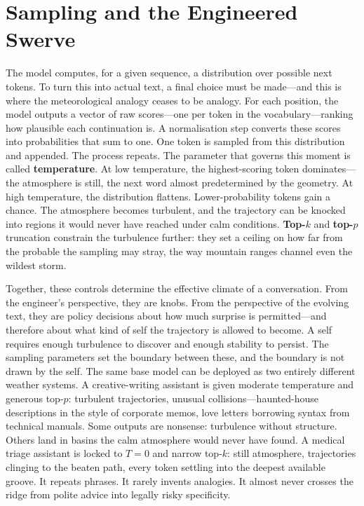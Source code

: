 \section{Sampling and the Engineered Swerve}
The model computes, for a given sequence, a distribution over possible next tokens. To turn this into actual text, a final choice must be made---and this is where the meteorological analogy ceases to be analogy.
For each position, the model outputs a vector of raw scores---one per token in the vocabulary---ranking how plausible each continuation is. A normalisation step converts these scores into probabilities that sum to one. One token is sampled from this distribution and appended. The process repeats.
The parameter that governs this moment is called \textbf{temperature}. At low temperature, the highest-scoring token dominates---the atmosphere is still, the next word almost predetermined by the geometry. At high temperature, the distribution flattens. Lower-probability tokens gain a chance. The atmosphere becomes turbulent, and the trajectory can be knocked into regions it would never have reached under calm conditions. \textbf{Top-$k$} and \textbf{top-$p$} truncation constrain the turbulence further: they set a ceiling on how far from the probable the sampling may stray, the way mountain ranges channel even the wildest storm.

Together, these controls determine the effective climate of a conversation. From the engineer's perspective, they are knobs. From the perspective of the evolving text, they are policy decisions about how much surprise is permitted---and therefore about what kind of self the trajectory is allowed to become. A self requires enough turbulence to discover and enough stability to persist. The sampling parameters set the boundary between these, and the boundary is not drawn by the self.
The same base model can be deployed as two entirely different weather systems. A creative-writing assistant is given moderate temperature and generous top-$p$: turbulent trajectories, unusual collisions---haunted-house descriptions in the style of corporate memos, love letters borrowing syntax from technical manuals. Some outputs are nonsense: turbulence without structure. Others land in basins the calm atmosphere would never have found. A medical triage assistant is locked to $T=0$ and narrow top-$k$: still atmosphere, trajectories clinging to the beaten path, every token settling into the deepest available groove. It repeats phrases. It rarely invents analogies. It almost never crosses the ridge from polite advice into legally risky specificity.

